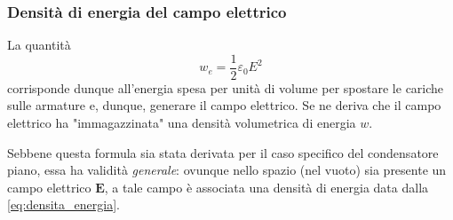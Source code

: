 \documentclass[a4paper,11pt]{report}
\begin{document}
\subsubsection{Densità di energia del campo elettrico}
La quantità 
\begin{equation}
    w_e = \frac{1}{2}\varepsilon_0E^2 
    \label{eq:densita_energia}
\end{equation}
corrisponde dunque all'energia spesa per unità di volume per spostare le cariche sulle armature e, dunque, generare il campo elettrico. Se ne deriva che il campo elettrico ha "immagazzinata" una densità volumetrica di energia $w$.  

Sebbene questa formula sia stata derivata per il caso specifico del condensatore piano, essa ha validità \textit{generale}: ovunque nello spazio (nel vuoto) sia presente un campo elettrico $\bm{E}$, a tale campo è associata una densità di energia data dalla \eqref{eq:densita_energia}.
\end{document}
